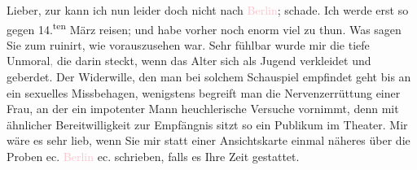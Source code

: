 \pstart
           Lieber, zur \label{K_L03339-1v}\label{K_L03339-1h} kann ich nun leider doch nicht nach \textcolor{pink}{Berlin}{}\ledrightnote{\textcolor{pink}{Berlin}}; schade. Ich werde erst so gegen 14.\textsuperscript{ten} März reisen; und habe vorher noch enorm viel
               zu thun. Was sagen Sie zum \label{K_L03339-2v}\label{K_L03339-2h} ruinirt, wie vorauszusehen war. Sehr fühlbar wurde mir die tiefe
                  Unmoral\textcolor{gray}{,} die darin steckt, wenn das Alter sich als Jugend
               verkleidet und geberdet. Der Widerwille, den man bei solchem Schauspiel empfindet
               geht bis an ein sexuelles Missbehagen, wenigstens begreift man die Nervenzerrüttung
               einer Frau, an der ein impotenter Mann heuchlerische Versuche vornimmt, denn mit
               ähnlicher Bereitwilligkeit zur Empfängnis sitzt so ein Publikum im Theater. Mir wäre
               es sehr lieb, wenn Sie mir statt einer Ansichtskarte einmal näheres über die Proben
               ec. \textcolor{pink}{Berlin}{}\ledrightnote{\textcolor{pink}{Berlin}} ec. schrieben, falls es Ihre Zeit
               gestattet.\pend
           
